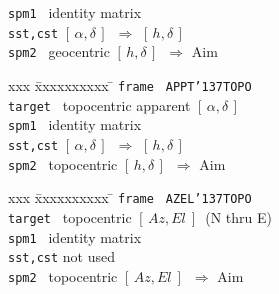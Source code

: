 \documentclass[12pt,fleqn,twoside]{article}
\renewcommand{\_}{{\tt\char'137}}     %
\newcommand{\radec}     {$[\,\alpha,\delta\,]$}
\newcommand{\hadec}     {$[\,h,\delta\,]$}
\newcommand{\azel}      {$[\,Az,El~]$}
\begin{document}
{\begin{enumerate}
\begin{tabbing}
         \> {\tt spm1   } \> identity matrix \\
         \> {\tt sst,cst} \> \radec\ $\Rightarrow$ \hadec \\
         \> {\tt spm2   } \> geocentric \hadec\ $\Rightarrow$ {\sc Aim}
      \end{tabbing}
      \begin{tabbing}
         xxx \= xxxxxxxxxx \= \kill
         \> {\tt frame  } \> {\tt APPT\_TOPO} \\
         \> {\tt target } \> topocentric apparent \radec \\
         \> {\tt spm1   } \> identity matrix \\
         \> {\tt sst,cst} \> \radec\ $\Rightarrow$ \hadec \\
         \> {\tt spm2   } \> topocentric \hadec\ $\Rightarrow$ {\sc Aim}
      \end{tabbing}
      \begin{tabbing}
         xxx \= xxxxxxxxxx \= \kill
         \> {\tt frame  } \> {\tt AZEL\_TOPO} \\
         \> {\tt target } \> topocentric \azel\ (N thru E) \\
         \> {\tt spm1   } \> identity matrix \\
         \> {\tt sst,cst} \> not used \\
         \> {\tt spm2   } \> topocentric \azel\ $\Rightarrow$ {\sc Aim}
      \end{tabbing}


\end{enumerate}}
\end{document}
